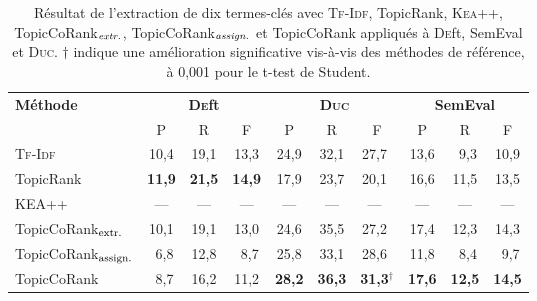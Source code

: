         \begin{table}
          \centering
            \begin{tabular}{l|ccc|ccc|ccc}
              \toprule
              \multirow{2}{*}{\textbf{Méthode}} & \multicolumn{3}{c|}{\textbf{\textsc{De}ft}} & \multicolumn{3}{c|}{\textbf{\textsc{Duc}}} & \multicolumn{3}{c}{\textbf{SemEval}}\\
              \cline{2-10}
              & P & R & F & P & R & F & P & R & F\\
              \hline
              \textsc{Tf-Idf} & 10,4 & 19,1 & 13,3 & 24,9 & 32,1 & 27,7$^{~~}$ & 13,6 & $~~$9,3 & 10,9\\
              TopicRank & \textbf{11,9} & \textbf{21,5} & \textbf{14,9} & 17,9 & 23,7 & 20,1$^{~~}$ & 16,6 & 11,5 & 13,5\\
              KEA++ & --- & --- & --- & --- & --- & ---$^{~~}$ & --- & --- & ---\\
              \hline
              TopicCoRank$_\textnormal{extr.}$ & 10,1 & 19,1 & 13,0 & 24,6 & 35,5 & 27,2$^{~~}$ & 17,4 & 12,3 & 14,3\\
              TopicCoRank$_\textnormal{assign.}$ & $~~$6,8 & 12,8 & $~~$8,7 & 25,8 & 33,1 & 28,6$^{~~}$ & 11,8 & $~~$8,4 & $~~$9,7\\
              \hline
              TopicCoRank & $~~$8,7 & 16,2 & 11,2 & \textbf{28,2} & \textbf{36,3} & \textbf{31,3}$^\dagger$ & \textbf{17,6} & \textbf{12,5} & \textbf{14,5}\\
              \bottomrule
            \end{tabular}
        \caption[
          Résultat de l'extraction de dix termes-clés avec \textsc{Tf-Idf},
          TopicRank, \textsc{Kea++}, TopicCoRank$_\textnormal{\textit{extr.}}$,
          TopicCoRank$_\textnormal{\textit{assign.}}$ et TopicCoRank appliqués à
          \textsc{De}ft, SemEval et \textsc{Duc}
        ]{
          Résultat de l'extraction de dix termes-clés avec \textsc{Tf-Idf},
          TopicRank, \textsc{Kea++}, TopicCoRank$_\textnormal{\textit{extr.}}$,
          TopicCoRank$_\textnormal{\textit{assign.}}$ et TopicCoRank appliqués à
          \textsc{De}ft, SemEval et \textsc{Duc}. $\dagger$ indique une
          amélioration significative vis-à-vis des méthodes de référence, à
          0,001 pour le t-test de Student.
          \label{tab:topiccorank-comparison_results_general}}
        \end{table}


